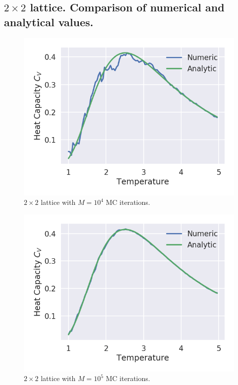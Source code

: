 \documentclass[aps,reprint]{revtex4-1}
\begin{document}
\subsection{$2 \times 2$ lattice. Comparison of numerical and analytical values.}
\begin{figure}[H]
  \centering
  \includegraphics[width=\columnwidth]{figures/L2Ne4.png}
  \caption{$2 \times 2$ lattice with $M = 10^4$ MC iterations.}
  \label{fig:L2Ne4}
\end{figure}
\begin{figure}[H]
  \centering
  \includegraphics[width=\columnwidth]{figures/L2Ne5.png}
  \caption{$2 \times 2$ lattice with $M = 10^5$ MC iterations.}
  \label{fig:L2Ne5}
\end{figure}
\end{document}
